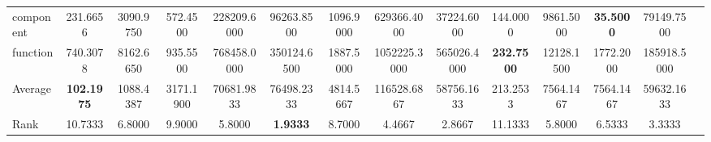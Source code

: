 \begin{threeparttable}
\begin{tabular}{lccccccccccccc}
component &231.6656 &3090.9750 &572.4500 &228209.6000 &96263.8500 &1096.9000 &629366.4000 &37224.6000 &144.0000 &9861.5000 &\textbf{35.5000} &79149.7500 &  \\
function &740.3078 &8162.6650 &935.5500 &768458.0000 &350124.6500 &1887.5000 &1052225.3000 &565026.4000 &\textbf{232.7500} &12128.1500 &1772.2000 &185918.5000 &  \\
\hline
Average &\textbf{102.1975} &1088.4387 &3171.1900 &70681.9833 &76498.2333 &4814.5667 &116528.6867 &58756.1633 &213.2533 &7564.1467 &7564.1467 &59632.1633 &  \\
Rank &10.7333 &6.8000 &9.9000 &5.8000 &\textbf{1.9333} &8.7000 &4.4667 &2.8667 &11.1333 &5.8000 &6.5333 &3.3333 &  \\
\bottomrule
\end{tabular}
\end{threeparttable}